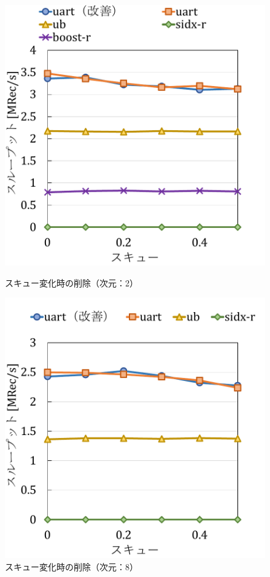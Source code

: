 \begin{figure}[tb]
  \begin{minipage}[c]{0.495\textwidth}
    \centering
    \includegraphics[scale=0.5]{./figures/graph-skew-delete-2.pdf}
    \caption{スキュー変化時の削除（次元：2）}
    \label{graph:grouped}
  \end{minipage}
  \begin{minipage}[c]{0.495\textwidth}
    \centering
    \includegraphics[scale=0.5]{./figures/graph-skew-delete-8.pdf}
    \caption{スキュー変化時の削除（次元：8）}
    \label{graph:paired}
  \end{minipage}
\end{figure}

